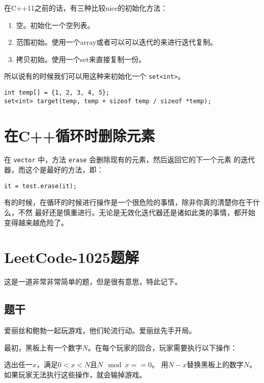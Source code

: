 在C++11之前的话，有三种比较nice的初始化方法：
\begin{enumerate}
\item 空。初始化一个空列表。
\item 范围初始。使用一个array或者可以可以迭代的来进行迭代复制。
\item 拷贝初始。使用一个set来直接复制一份。
\end{enumerate}

所以说有的时候我们可以用这种来初始化一个 \verb|set<int>|。
\begin{lstlisting}
int temp[] = {1, 2, 3, 4, 5};
set<int> target(temp, temp + sizeof temp / sizeof *temp);
\end{lstlisting}


\section{在C++循环时删除元素}

在 \verb|vector| 中，方法 \verb|erase| 会删除现有的元素，然后返回它的下一个元素
的迭代器，而这个是最好的方法，即：
\begin{lstlisting}
it = test.erase(it);
\end{lstlisting}

有的时候，在循环的时候进行操作是一个很危险的事情，除非你真的清楚你在干什么，不然
最好还是慎重进行。无论是无效化迭代器还是诸如此类的事情，都开始变得越来越危险了。


\section{LeetCode-1025题解}

这是一道非常非常简单的题，但是很有意思，特此记下。

\subsection{题干}

爱丽丝和鲍勃一起玩游戏，他们轮流行动。爱丽丝先手开局。

最初，黑板上有一个数字$N$。在每个玩家的回合，玩家需要执行以下操作：

选出任一$x$，满足$0 < x < N$且$N \mod x == 0$。
用$N - x$替换黑板上的数字$N$。
如果玩家无法执行这些操作，就会输掉游戏。

